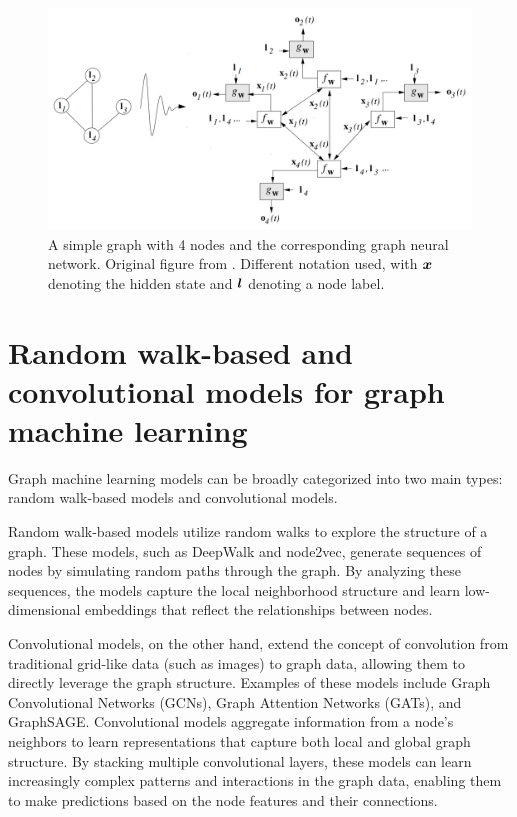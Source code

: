 \begin{figure}
	\includegraphics[width=\linewidth]{images/GNN-gori.png}
	\caption{A simple graph with 4 nodes and the corresponding graph neural network. Original figure from \cite{gori_new_2005}. Different notation used, with \( \bm{x} \) denoting the hidden state and \( \bm{l} \) denoting a node label.}
	\label{fig:gori}
\end{figure}

\section{Random walk-based and convolutional models for graph machine learning}

Graph machine learning models can be broadly categorized into two main types: random walk-based models and convolutional models.

Random walk-based models utilize random walks to explore the structure of a graph. These models, such as DeepWalk and node2vec, generate sequences of nodes by simulating random paths through the graph. By analyzing these sequences, the models capture the local neighborhood structure and learn low-dimensional embeddings that reflect the relationships between nodes.

Convolutional models, on the other hand, extend the concept of convolution from traditional grid-like data (such as images) to graph data, allowing them to directly leverage the graph structure. Examples of these models include Graph Convolutional Networks (GCNs), Graph Attention Networks (GATs), and GraphSAGE\@. Convolutional models aggregate information from a node’s neighbors to learn representations that capture both local and global graph structure. By stacking multiple convolutional layers, these models can learn increasingly complex patterns and interactions in the graph data, enabling them to make predictions based on the node features and their connections.

